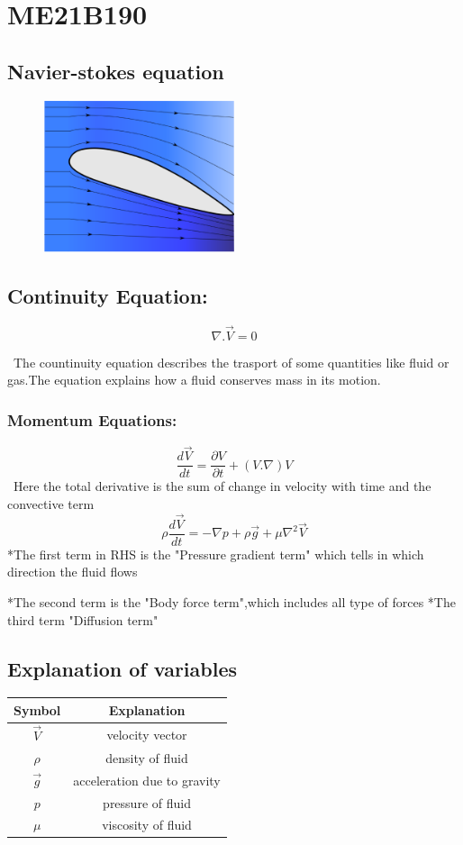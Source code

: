 \section{ME21B190}
\subsection{Navier-stokes equation}
   
\begin{figure}[h]
\centering\includegraphics[width=0.5\textwidth]{./ME21B190/air.eps}
\end{figure}
\subsection{Continuity Equation:}

$$\nabla.\vec{V}=0$$


\large\ The countinuity equation describes the trasport of some quantities like fluid or gas.The equation explains how a fluid conserves mass in its motion.
\subsubsection {Momentum Equations:}

$$\frac{d\vec{V}}{dt}=\frac{\partial V}{\partial t} + (V.\nabla)V$$
\ Here the total derivative is the sum of change in velocity with time and the convective term
$$\rho\frac{d\vec{V}}{dt}=-\nabla{p} + \rho\vec{g}+\mu\nabla^{2}\vec{V}$$
 *The first term in RHS is the "Pressure gradient term" which tells in which direction the fluid flows

*The second term is the "Body force term",which includes all type of forces
*The third term "Diffusion term" 
\subsection{Explanation of variables}
\begin{center}
\begin{tabular}{ c c } 
   \hline
   \textbf{Symbol} & \textbf{Explanation} \\
   \hline
   $\vec{V}$ & velocity vector \\
   \hline
   $\rho$ & density of fluid \\
   \hline
   $\vec{g}$ & acceleration due to gravity \\
   \hline
   ${p}$ & pressure of fluid \\
   \hline
   $\mu$ & viscosity of fluid \\
   \hline
\end{tabular}
\end{center}
